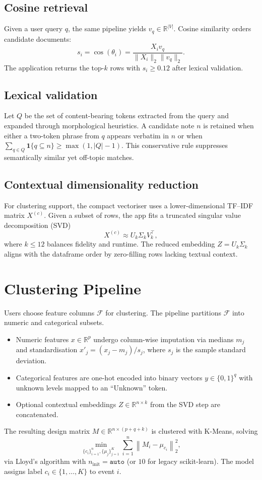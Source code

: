 \documentclass[11pt]{article}
\begin{document}
\subsection{Cosine retrieval}
Given a user query $q$, the same pipeline yields $v_q \in \mathbb{R}^{|V|}$. Cosine similarity orders candidate documents:
\[ s_i = \cos(\theta_i) = \frac{X_i v_q}{\lVert X_i \rVert_2 \lVert v_q \rVert_2}. \]
The application returns the top-$k$ rows with $s_i \ge 0.12$ after lexical validation.

\subsection{Lexical validation}
Let $Q$ be the set of content-bearing tokens extracted from the query and expanded through morphological heuristics. A candidate note $n$ is retained when either a two-token phrase from $q$ appears verbatim in $n$ or when $\sum_{q \in Q} \mathbf{1}\{q \subseteq n\} \ge \max(1, |Q| - 1)$. This conservative rule suppresses semantically similar yet off-topic matches.

\subsection{Contextual dimensionality reduction}
For clustering support, the compact vectoriser uses a lower-dimensional TF--IDF matrix $X^{(c)}$. Given a subset of rows, the app fits a truncated singular value decomposition (SVD)
\[ X^{(c)} \approx U_k \Sigma_k V_k^\top, \]
where $k \le 12$ balances fidelity and runtime. The reduced embedding $Z = U_k \Sigma_k$ aligns with the dataframe order by zero-filling rows lacking textual context.

\section{Clustering Pipeline}
Users choose feature columns $\mathcal{F}$ for clustering. The pipeline partitions $\mathcal{F}$ into numeric and categorical subsets.
\begin{itemize}
  \item Numeric features $x \in \mathbb{R}^p$ undergo column-wise imputation via medians $m_j$ and standardisation $x'_j = (x_j - m_j) / s_j$, where $s_j$ is the sample standard deviation.
  \item Categorical features are one-hot encoded into binary vectors $y \in \{0,1\}^q$ with unknown levels mapped to an ``Unknown'' token.
  \item Optional contextual embeddings $Z \in \mathbb{R}^{n \times k}$ from the SVD step are concatenated.
\end{itemize}
The resulting design matrix $M \in \mathbb{R}^{n \times (p + q + k)}$ is clustered with K-Means, solving
\[ \min_{\{c_i\}_{i=1}^n, \{\mu_j\}_{j=1}^K} \sum_{i=1}^n \left\lVert M_i - \mu_{c_i} \right\rVert_2^2, \]
via Lloyd's algorithm with $n_{\text{init}} = \texttt{auto}$ (or $10$ for legacy scikit-learn). The model assigns label $c_i \in \{1,\dots,K\}$ to event $i$.
\end{document}
